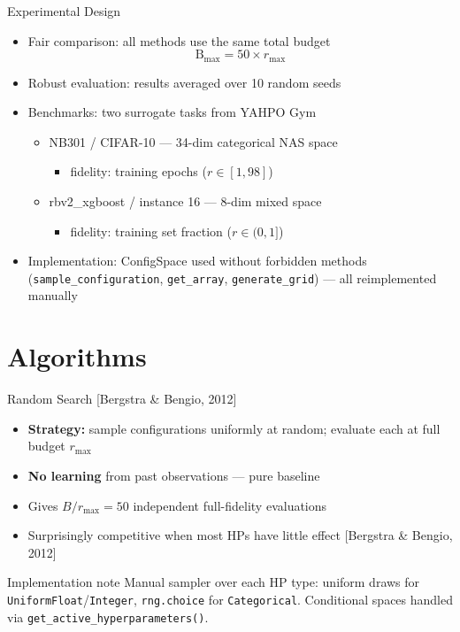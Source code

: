\documentclass[t,english]{beamer}
\newcommand{\citeref}[1]{{\color{rwth-blue-75}\small[#1]}}
\begin{document}
\begin{frame}{Experimental Design}
  \begin{itemize}[<+->]
    \item Fair comparison: all methods use the same total budget 
          \[
          \text{B}_{\max} = 50 \times r_{\max}
          \]
    \item Robust evaluation: results averaged over 10 random seeds
    \item Benchmarks: two surrogate tasks from YAHPO Gym
      \begin{itemize}[<+->]
        \item NB301 / CIFAR-10 — 34-dim categorical NAS space
          \begin{itemize}
            \item fidelity: training epochs ($r \in [1, 98]$)
          \end{itemize}
        \item rbv2\_xgboost / instance 16 — 8-dim mixed space
          \begin{itemize}
            \item fidelity: training set fraction ($r \in (0, 1]$)
          \end{itemize}
      \end{itemize}
    \item Implementation: ConfigSpace used without forbidden methods
          (\texttt{sample\_configuration}, \texttt{get\_array},
           \texttt{generate\_grid}) — all reimplemented manually
  \end{itemize}
\end{frame}


\section{Algorithms}

\begin{frame}{Random Search \citeref{Bergstra \& Bengio, 2012}}
  \begin{itemize}[<+->]
    \item \textbf{Strategy:} sample configurations \alert{uniformly at random};
          evaluate each at full budget $r_{\max}$
    \item \textbf{No learning} from past observations — pure baseline
    \item Gives $B / r_{\max} = 50$ independent full-fidelity evaluations
    \item Surprisingly competitive when most HPs have little effect
          \citeref{Bergstra \& Bengio, 2012}
  \end{itemize}

  \vspace{0.5em}
  \begin{block}{Implementation note}
    Manual sampler over each HP type:
    uniform draws for \texttt{UniformFloat}/\texttt{Integer},
    \texttt{rng.choice} for \texttt{Categorical}.
    Conditional spaces handled via \texttt{get\_active\_hyperparameters()}.
  \end{block}
\end{frame}
\end{document}
